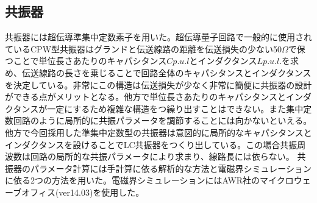
    \subsection{共振器}
        共振器には超伝導準集中定数素子を用いた。超伝導量子回路で一般的に使用されているCPW型共振器はグランドと伝送線路の距離を伝送損失の少ない50$\Omega$で保つことで単位長さあたりのキャパシタンス$Cp.u.l$とインダクタンス$Lp.u.l.$を求め、伝送線路の長さを乗じることで回路全体のキャパシタンスとインダクタンスを決定している。非常にこの構造は伝送損失が少なく非常に簡便に共振器の設計ができる点がメリットとなる。他方で単位長さあたりのキャパシタンスとインダクタンスが一定にするため複雑な構造をつ繰り出すことはできない。また集中定数回路のように局所的に共振パラメータを調節することには向かないといえる。他方で今回採用した準集中定数型の共振器は意図的に局所的なキャパシタンスとインダクタンスを設けることでLC共振器をつくり出している。この場合共振周波数は回路の局所的な共振パラメータにより求まり、線路長には依らない。
        共振器のパラメータ計算には手計算に依る解析的な方法と電磁界シミュレーションに依る2つの方法を用いた。電磁界シミュレーションにはAWR社のマイクロウェーブオフィス(ver14.03)を使用した。
